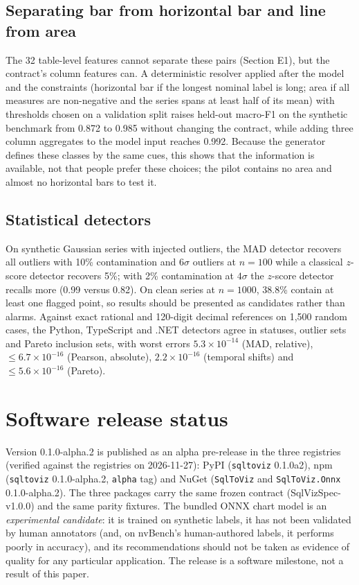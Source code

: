 \documentclass[11pt]{article}
\begin{document}
\subsection{Separating bar from horizontal bar and line from area}
The 32 table-level features cannot separate these pairs (Section E1), but the contract's column features can. A deterministic resolver applied after the model and the constraints (horizontal bar if the longest nominal label is long; area if all measures are non-negative and the series spans at least half of its mean) with thresholds chosen on a validation split raises held-out macro-F1 on the synthetic benchmark from 0.872 to 0.985 without changing the contract, while adding three column aggregates to the model input reaches 0.992. Because the generator defines these classes by the same cues, this shows that the information is available, not that people prefer these choices; the pilot contains no area and almost no horizontal bars to test it.

\subsection{Statistical detectors}
On synthetic Gaussian series with injected outliers, the MAD detector recovers all outliers with 10\% contamination and $6\sigma$ outliers at $n=100$ while a classical $z$-score detector recovers 5\%; with 2\% contamination at $4\sigma$ the $z$-score detector recalls more (0.99 versus 0.82). On clean series at $n=1000$, 38.8\% contain at least one flagged point, so results should be presented as candidates rather than alarms. Against exact rational and 120-digit decimal references on 1{,}500 random cases, the Python, TypeScript and .NET detectors agree in statuses, outlier sets and Pareto inclusion sets, with worst errors $5.3\times10^{-14}$ (MAD, relative), $\leq 6.7\times10^{-16}$ (Pearson, absolute), $2.2\times10^{-16}$ (temporal shifts) and $\leq 5.6\times10^{-16}$ (Pareto).

\section{Software release status}\label{sec:release}
Version 0.1.0-alpha.2 is published as an alpha pre-release in the three registries (verified against the registries on 2026-11-27): PyPI (\texttt{sqltoviz} 0.1.0a2), npm (\texttt{sqltoviz} 0.1.0-alpha.2, \texttt{alpha} tag) and NuGet (\texttt{SqlToViz} and \texttt{SqlToViz.Onnx} 0.1.0-alpha.2). The three packages carry the same frozen contract (SqlVizSpec-v1.0.0) and the same parity fixtures. The bundled ONNX chart model is an \emph{experimental candidate}: it is trained on synthetic labels, it has not been validated by human annotators (and, on nvBench's human-authored labels, it performs poorly in accuracy), and its recommendations should not be taken as evidence of quality for any particular application. The release is a software milestone, not a result of this paper.
\end{document}
